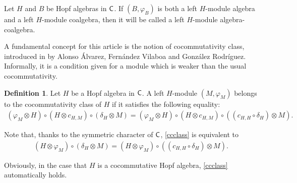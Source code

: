 \documentclass[11pt,reqno]{amsart}
\theoremstyle{plain}%
\theoremstyle{definition}
\newtheorem{definition}[theorem]{Definition}%
\theoremstyle{remark}
\begin{document}
Let $H$ and $B$ be Hopf algebras in ${\sf C}$. If $(B,\varphi_{B})$ is both a left $H$-module algebra and a left $H$-module coalgebra, then it will be called a left $H$-module algebra-coalgebra.

A fundamental concept for this article is the notion of cocommutativity class, introduced in \cite{AVG} by Alonso Álvarez, Fernández Vilaboa and González Rodríguez. Informally, it is a condition given for a module which is weaker than the usual cocommutativity.
\begin{definition}
	Let $H$ be a Hopf algebra in ${\sf C}$. A left $H$-module $(M,\varphi_{M})$ belongs to the cocommutativity class of $H$ if it satisfies the following equality:
	\begin{gather}\label{ccclass}
		(\varphi_{M}\otimes H)\circ(H\otimes c_{H,M})\circ(\delta_{H}\otimes M)=(\varphi_{M}\otimes H)\circ(H\otimes c_{H,M})\circ((c_{H,H}\circ\delta_{H})\otimes M).
	\end{gather}
	
	Note that, thanks to the symmetric character of ${\sf C}$, \eqref{ccclass} is equivalent to 
	\begin{gather}\label{ccclass2}
		(H\otimes\varphi_{M})\circ(\delta_{H}\otimes M)=(H\otimes\varphi_{M})\circ((c_{H,H}\circ\delta_{H})\otimes M).
	\end{gather}
	
	Obviously, in the case that $H$ is a cocommutative Hopf algebra, \eqref{ccclass} automatically holds.
\end{definition}
\end{document}
